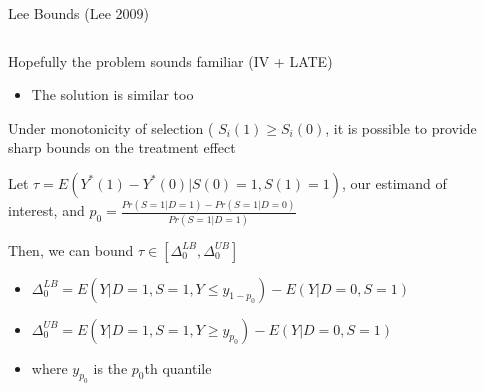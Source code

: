 \documentclass[notes,11pt, aspectratio=169]{beamer}
\newenvironment{wideitemize}{\itemize\addtolength{\itemsep}{10pt}}{\enditemize}
\begin{document}
\begin{frame}{Lee Bounds (Lee 2009)}
      \begin{columns}[onlytextwidth, T] %
        \begin{column}{.9\textwidth}
          \begin{wideitemize}
          \item Hopefully the problem sounds familiar (IV + LATE)
            \begin{itemize}
            \item The solution is similar too
            \end{itemize}
          \item Under monotonicity of selection (
            $S_{i}(1) \geq S_{i}(0)$, it is possible to provide sharp
            bounds on the treatment effect
          \item Let $\tau = E(Y^{*}(1) - Y^{*}(0) | S(0) = 1, S(1) = 1)$, our estimand of interest, and $p_{0} = \frac{Pr(S = 1 | D = 1) - Pr(S = 1| D = 0)}{Pr(S = 1 | D = 1)}$ 
          \item Then, we can bound $\tau \in [\Delta_{0}^{LB}, \Delta_{0}^{UB}]$
            \begin{itemize}
            \item $\Delta_{0}^{LB} = E(Y | D = 1, S = 1, Y \leq y_{1-p_{0}}) - E(Y | D = 0, S = 1)$
            \item $\Delta_{0}^{UB} = E(Y | D = 1, S = 1, Y \geq y_{p_{0}}) - E(Y | D = 0, S = 1)$
            \item where $y_{p_{0}}$ is the $p_{0}$th quantile
            \end{itemize}
          \end{wideitemize}
      \end{column}%
      \hfill%
      \begin{column}{.5\textwidth}

      \end{column}%
    \end{columns}
\end{frame}
\end{document}
